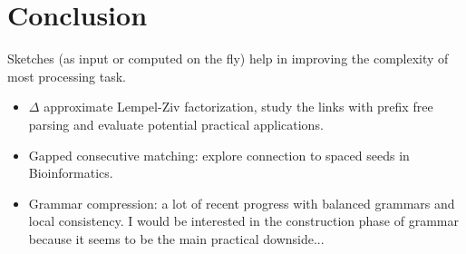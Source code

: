 \documentclass[aspectratio=169]{beamer}
\begin{document}
\section{Conclusion}
\begin{frame}
  \vfill
  \bigskip
  \begin{center}
    \pause
  \end{center}
  \vfill
\end{frame}

\begin{frame}
  \begin{center}
  \end{center}
   Sketches (as input or computed on the fly) help in improving the complexity of most processing task.

  \medskip
  \begin{itemize}
    \item $\Delta$ approximate Lempel-Ziv factorization, study the links with prefix free parsing and evaluate potential practical applications.
    \item Gapped consecutive matching: explore connection to spaced seeds in Bioinformatics.
    \item Grammar compression: a lot of recent progress with balanced grammars and local consistency. I would be interested in the construction phase of grammar because it seems to be the main practical downside...
  \end{itemize}

  \vfill
  \begin{center}
  \end{center}
\end{frame}

\backupbegin



\begin{frame}
  \tableofcontents
\end{frame}
\backupend
\end{document}
